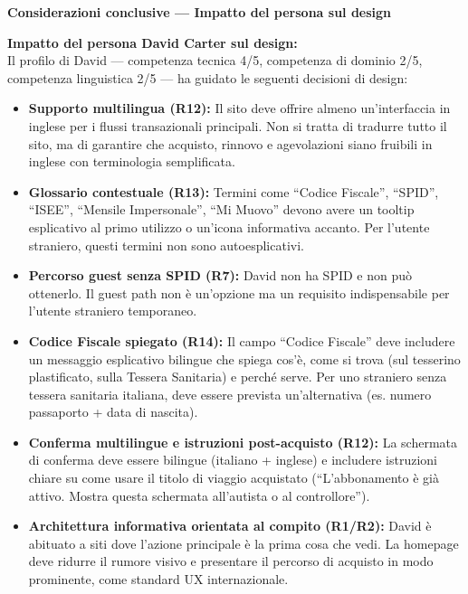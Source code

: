 \documentclass[11pt,a4paper]{article}
\begin{document}
\newpage


\begin{tcolorbox}[colback=primaryColor!10,colframe=primaryColor,arc=2mm]
    \textbf{Considerazioni conclusive --- Impatto del persona sul design}
\end{tcolorbox}

\vspace{0.3cm}

\begin{tcolorbox}[colback=backgroundColor,colframe=borderColor,arc=2mm]
    {\small
    \textbf{Impatto del persona David Carter sul design:} \\[4pt]
    Il profilo di David --- competenza tecnica 4/5, competenza di dominio 2/5, competenza linguistica 2/5 --- ha guidato le seguenti decisioni di design:
    \begin{itemize}[leftmargin=*]
        \item \textbf{Supporto multilingua (R12):} Il sito deve offrire almeno un'interfaccia in inglese per i flussi transazionali principali. Non si tratta di tradurre tutto il sito, ma di garantire che acquisto, rinnovo e agevolazioni siano fruibili in inglese con terminologia semplificata.
        \item \textbf{Glossario contestuale (R13):} Termini come ``Codice Fiscale'', ``SPID'', ``ISEE'', ``Mensile Impersonale'', ``Mi Muovo'' devono avere un tooltip esplicativo al primo utilizzo o un'icona informativa accanto. Per l'utente straniero, questi termini non sono autoesplicativi.
        \item \textbf{Percorso guest senza SPID (R7):} David non ha SPID e non pu\`o ottenerlo. Il guest path non \`e un'opzione ma un requisito indispensabile per l'utente straniero temporaneo.
        \item \textbf{Codice Fiscale spiegato (R14):} Il campo ``Codice Fiscale'' deve includere un messaggio esplicativo bilingue che spiega cos'\`e, come si trova (sul tesserino plastificato, sulla Tessera Sanitaria) e perch\'e serve. Per uno straniero senza tessera sanitaria italiana, deve essere prevista un'alternativa (es. numero passaporto + data di nascita).
        \item \textbf{Conferma multilingue e istruzioni post-acquisto (R12):} La schermata di conferma deve essere bilingue (italiano + inglese) e includere istruzioni chiare su come usare il titolo di viaggio acquistato (``L'abbonamento \`e gi\`a attivo. Mostra questa schermata all'autista o al controllore'').
        \item \textbf{Architettura informativa orientata al compito (R1/R2):} David \`e abituato a siti dove l'azione principale \`e la prima cosa che vedi. La homepage deve ridurre il rumore visivo e presentare il percorso di acquisto in modo prominente, come standard UX internazionale.
    \end{itemize}
    }
\end{tcolorbox}
\end{document}
